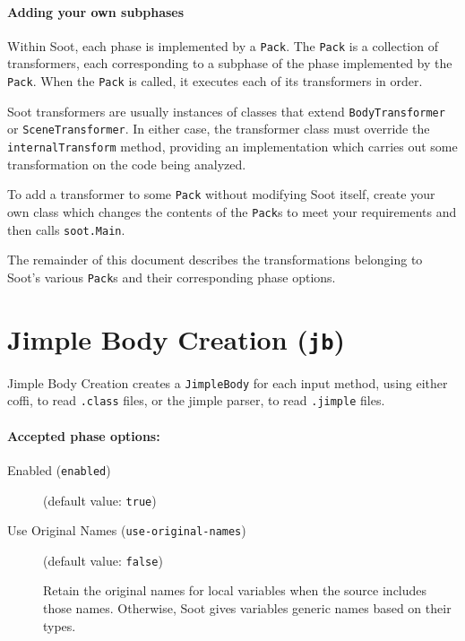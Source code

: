 \documentclass{article}
\begin{document}
\paragraph{Adding your own subphases}

\noindent
\par
Within Soot, each phase is implemented by a {\tt Pack}. The {\tt Pack}
is a collection of transformers, each corresponding to a subphase of
the phase implemented by the {\tt Pack}. When the {\tt Pack} is
called, it executes each of its transformers in order.

Soot transformers are usually instances of classes that extend 
{\tt BodyTransformer} or {\tt SceneTransformer}.  In either case, the
transformer class must override the {\tt internalTransform} method,
providing an implementation which carries out some transformation on
the code being analyzed.

To add a transformer to some {\tt Pack} without modifying Soot itself,
create your own class which changes the contents of the {\tt Pack}s to
meet your requirements and then calls {\tt soot.Main}.

\vspace{3ex}

The remainder of this document describes the transformations belonging
to Soot's various {\tt Pack}s and their corresponding phase
options.

\tableofcontents


\section{Jimple Body Creation ({\tt jb})}

Jimple Body Creation creates a {\tt JimpleBody} for each input
method, using either coffi, to read {\tt .class} files, or the
jimple parser, to read {\tt .jimple} files.


\paragraph{Accepted phase options:} 

\begin{description}

\item[Enabled ({\tt enabled})]
(default value: {\tt true})






\item[Use Original Names ({\tt use-original-names})]
(default value: {\tt false})




Retain the original names for local variables when the source
includes those names.  Otherwise, Soot gives variables generic
names based on their types.



\end{description}
\end{document}
